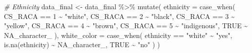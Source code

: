 \documentclass[
]{article}
\newenvironment{Shaded}{\begin{snugshade}}{\end{snugshade}}
\newcommand{\AttributeTok}[1]{\textcolor[rgb]{0.77,0.63,0.00}{#1}}
\newcommand{\CommentTok}[1]{\textcolor[rgb]{0.56,0.35,0.01}{\textit{#1}}}
\newcommand{\ConstantTok}[1]{\textcolor[rgb]{0.00,0.00,0.00}{#1}}
\newcommand{\DecValTok}[1]{\textcolor[rgb]{0.00,0.00,0.81}{#1}}
\newcommand{\FunctionTok}[1]{\textcolor[rgb]{0.00,0.00,0.00}{#1}}
\newcommand{\NormalTok}[1]{#1}
\newcommand{\OtherTok}[1]{\textcolor[rgb]{0.56,0.35,0.01}{#1}}
\newcommand{\SpecialCharTok}[1]{\textcolor[rgb]{0.00,0.00,0.00}{#1}}
\newcommand{\StringTok}[1]{\textcolor[rgb]{0.31,0.60,0.02}{#1}}
\begin{document}
\begin{Shaded}
\begin{Highlighting}[]
\CommentTok{\# Ethnicity}
\NormalTok{data\_final }\OtherTok{\textless{}{-}}\NormalTok{  data\_final }\SpecialCharTok{\%\textgreater{}\%}
  \FunctionTok{mutate}\NormalTok{(}
    \AttributeTok{ethnicity =} \FunctionTok{case\_when}\NormalTok{(}
\NormalTok{      CS\_RACA }\SpecialCharTok{==} \DecValTok{1} \SpecialCharTok{\textasciitilde{}} \StringTok{"white"}\NormalTok{,}
\NormalTok{      CS\_RACA }\SpecialCharTok{==} \DecValTok{2} \SpecialCharTok{\textasciitilde{}} \StringTok{"black"}\NormalTok{,}
\NormalTok{      CS\_RACA }\SpecialCharTok{==} \DecValTok{3} \SpecialCharTok{\textasciitilde{}} \StringTok{"yellow"}\NormalTok{,}
\NormalTok{      CS\_RACA }\SpecialCharTok{==} \DecValTok{4} \SpecialCharTok{\textasciitilde{}} \StringTok{"brown"}\NormalTok{,}
\NormalTok{      CS\_RACA }\SpecialCharTok{==} \DecValTok{5} \SpecialCharTok{\textasciitilde{}} \StringTok{"indigenous"}\NormalTok{,}
      \ConstantTok{TRUE} \SpecialCharTok{\textasciitilde{}} \ConstantTok{NA\_character\_}
\NormalTok{    ), }
    \AttributeTok{white\_color =} \FunctionTok{case\_when}\NormalTok{(}
\NormalTok{      ethnicity }\SpecialCharTok{==} \StringTok{"white"} \SpecialCharTok{\textasciitilde{}} \StringTok{"yes"}\NormalTok{, }
      \FunctionTok{is.na}\NormalTok{(ethnicity) }\SpecialCharTok{\textasciitilde{}} \ConstantTok{NA\_character\_}\NormalTok{, }
      \ConstantTok{TRUE} \SpecialCharTok{\textasciitilde{}} \StringTok{"no"}
\NormalTok{    )}
\NormalTok{  )}


\end{Highlighting}
\end{Shaded}
\end{document}
